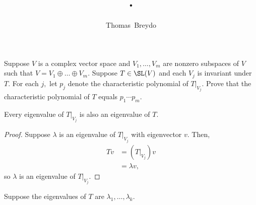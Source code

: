 \documentclass{amsart}
\title{\pagenum.\probnum}
\author{Thomas\ Breydo}
\newcommand{\restrict}[2]{\left.#1\right|_{#2}}
\begin{document}
\maketitle

\begin{problem*}
Suppose $V$ is a complex vector space and $V_1,\dots,V_m$ are
nonzero subspaces of $V$ such that $V=V_1\oplus\dots\oplus V_m.$
Suppose $T\in\SL(V)$ and each $V_j$ is invariant under $T.$
For each $j,$ let $p_j$ denote the characteristic polynomial
of $\restrict{T}{V_j}.$ Prove that the characteristic
polynomial of $T$ equals $p_1\cdots p_m.$
\end{problem*}

\vspace{0.5in}

\begin{claim*}
Every eigenvalue of $\restrict{T}{V_j}$ is also an eigenvalue
of $T.$
\end{claim*}
\begin{proof}
Suppose $\lambda$ is an eigenvalue of $\restrict{T}{V_j}$ with
eigenvector $v.$ Then,
\begin{align*}
    Tv
    &= \left(\restrict{T}{V_j}\right)v \\
    &= \lambda v,
\end{align*}
so $\lambda$ is an eigenvalue of $\restrict{T}{V_j}.$
\end{proof}

\vspace{\baselineskip}

Suppose the eigenvalues of $T$ are $\lambda_1,\dots,\lambda_k.$
\end{document}
